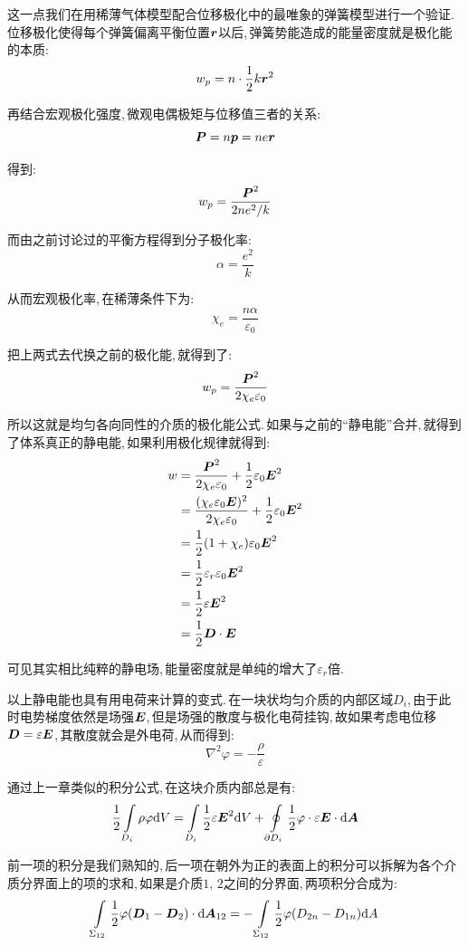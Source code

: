 这一点我们在用稀薄气体模型配合位移极化中的最唯象的弹簧模型进行一个验证.\,位移极化使得每个弹簧偏离平衡位置$\boldsymbol{r}$以后,\,弹簧势能造成的能量密度就是极化能的本质:
\[w_p=n\cdot\frac{1}{2}k\boldsymbol{r}^2\]

再结合宏观极化强度,\,微观电偶极矩与位移值三者的关系:
\[\boldsymbol{P}=n\boldsymbol{p}=ne\boldsymbol{r}\]

得到:
\[w_p=\frac{\boldsymbol{P}^2}{2ne^2/k}\]

而由之前讨论过的平衡方程得到分子极化率:
\[\alpha=\frac{e^2}{k}\]

从而宏观极化率,\,在稀薄条件下为:
\[\chi_e=\frac{n\alpha }{\varepsilon_0}\]

把上两式去代换之前的极化能,\,就得到了:
\[w_p=\frac{\boldsymbol{P}^2}{2\chi_e\varepsilon_0}\]

所以这就是均匀各向同性的介质的极化能公式.\,如果与之前的``静电能''合并,\,就得到了体系真正的静电能,\,如果利用极化规律就得到:
\begin{align*}
w 	&=\frac{\boldsymbol{P}^2}{2\chi_e\varepsilon_0}+\frac{1}{2}\varepsilon_0 \boldsymbol{E}^2\\
	&=\frac{(\chi_e\varepsilon_0\boldsymbol{E})^2}{2\chi_e\varepsilon_0}+\frac{1}{2}\varepsilon_0 \boldsymbol{E}^2\\
	&=\frac{1}{2}(1+\chi_e)\varepsilon_0\boldsymbol{E}^2\\
	&=\frac{1}{2}\varepsilon_r\varepsilon_0\boldsymbol{E}^2\\
	&=\frac{1}{2}\varepsilon\boldsymbol{E}^2\\
	&=\frac{1}{2}\boldsymbol{D}\cdot \boldsymbol{E}
\end{align*}

可见其实相比纯粹的静电场,\,能量密度就是单纯的增大了$\varepsilon_r$倍.

以上静电能也具有用电荷来计算的变式.\,在一块状均匀介质的内部区域$D_i$,\,由于此时电势梯度依然是场强$\boldsymbol{E}$,\,但是场强的散度与极化电荷挂钩,\,故如果考虑电位移$\boldsymbol{D}=\varepsilon\boldsymbol{E}$,\,其散度就会是外电荷,\,从而得到:
\[\nabla^2\varphi=-\frac{\rho}{\varepsilon}\]

通过上一章类似的积分公式,\,在这块介质内部总是有:
\[\frac{1}{2}\int\limits_{D_i} \rho\varphi\textrm{d} V=\int\limits_{D_i} \frac{1}{2}\varepsilon\boldsymbol{E}^2\textrm{d} V+ \oint\limits_{\partial {D_i}} \frac{1}{2}\varphi\cdot\varepsilon\boldsymbol{E}\cdot \textrm{d} \boldsymbol{A}\]

前一项的积分是我们熟知的,\,后一项在朝外为正的表面上的积分可以拆解为各个介质分界面上的项的求和,\,如果是介质$1,\,2$之间的分界面,\,两项积分合成为:
\[\int\limits_{\Sigma_{12}} \frac{1}{2}\varphi(\boldsymbol{D}_1-\boldsymbol{D}_2)\cdot \textrm{d} \boldsymbol{A}_{12}=-\int\limits_{\Sigma_{12}} \frac{1}{2}\varphi(D_{2n}-D_{1n})\textrm{d} A\]

